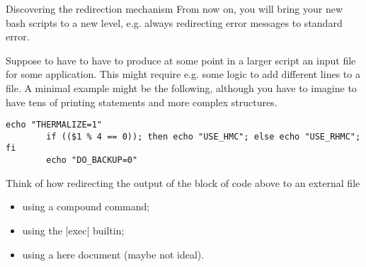 
\begin{exercise}[Instructive]{Discovering the redirection mechanism}
    From now on, you will bring your new bash scripts to a new level, e.g. always redirecting error messages to standard error.
    
    Suppose to have to have to produce at some point in a larger script an input file for some application.
    This might require e.g. some logic to add different lines to a file.
    A minimal example might be the following, although you have to imagine to have tens of printing statements and more complex structures.
    \begin{lstlisting}[style=myBash]
        echo "THERMALIZE=1"
        if (($1 % 4 == 0)); then echo "USE_HMC"; else echo "USE_RHMC"; fi
        echo "DO_BACKUP=0"
    \end{lstlisting}
    
    Think of how redirecting the output of the block of code above to an external file
    \begin{itemize}[nosep]
        \item using a compound command;
        \item using the \bash|exec| builtin;
        \item using a here document (maybe not ideal).
    \end{itemize}
\end{exercise}